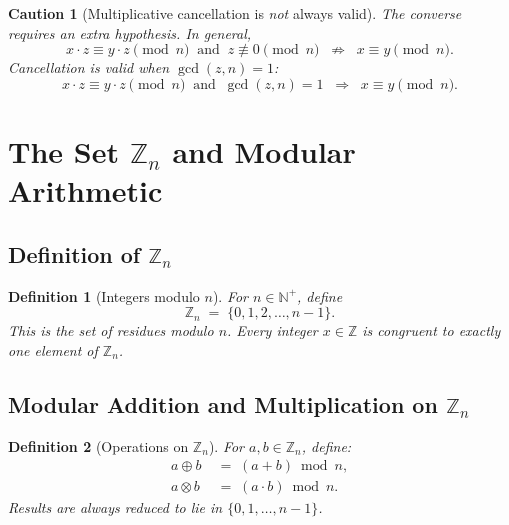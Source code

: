 \documentclass[11pt]{article}
\theoremstyle{defstyle}
\newtheorem{definition}{Definition}[section]
\theoremstyle{thmstyle}
\theoremstyle{notstyle}
\theoremstyle{cautionstyle}
\newtheorem*{caution}{Caution}
\newcommand{\Z}{\mathbb{Z}}
\newcommand{\N}{\mathbb{N}}
\begin{document}
\begin{cautionbox}
\begin{caution}[Multiplicative cancellation is \emph{not} always valid]
The converse requires an extra hypothesis.  In general,
\[
  x \cdot z \equiv y \cdot z \pmod{n}
  \;\;\text{and}\;\; z \not\equiv 0 \pmod{n}
  \;\;\not\Rightarrow\;\; x \equiv y \pmod{n}.
\]
Cancellation \emph{is} valid when $\gcd(z, n) = 1$:
\[
  x \cdot z \equiv y \cdot z \pmod{n}
  \;\;\text{and}\;\; \gcd(z,n)=1
  \;\;\Rightarrow\;\; x \equiv y \pmod{n}.
\]
\end{caution}
\end{cautionbox}

\section{The Set \texorpdfstring{$\mathbb{Z}_n$}{Zn} and Modular Arithmetic}

\subsection{Definition of \texorpdfstring{$\mathbb{Z}_n$}{Zn}}

\begin{defbox}
\begin{definition}[Integers modulo $n$]
For $n \in \N^+$, define
\[
  \mathbb{Z}_n \;=\; \{0, 1, 2, \ldots, n-1\}.
\]
This is the set of \emph{residues} modulo $n$.  Every integer $x \in \Z$ is congruent to exactly one element of $\mathbb{Z}_n$.
\end{definition}
\end{defbox}

\subsection{Modular Addition and Multiplication on \texorpdfstring{$\mathbb{Z}_n$}{Zn}}

\begin{defbox}
\begin{definition}[Operations on $\mathbb{Z}_n$]
For $a, b \in \mathbb{Z}_n$, define:
\begin{align*}
  a \oplus b &\;=\; (a + b) \bmod n, \\
  a \otimes b &\;=\; (a \cdot b) \bmod n.
\end{align*}
Results are always reduced to lie in $\{0, 1, \ldots, n-1\}$.
\end{definition}
\end{defbox}
\end{document}
